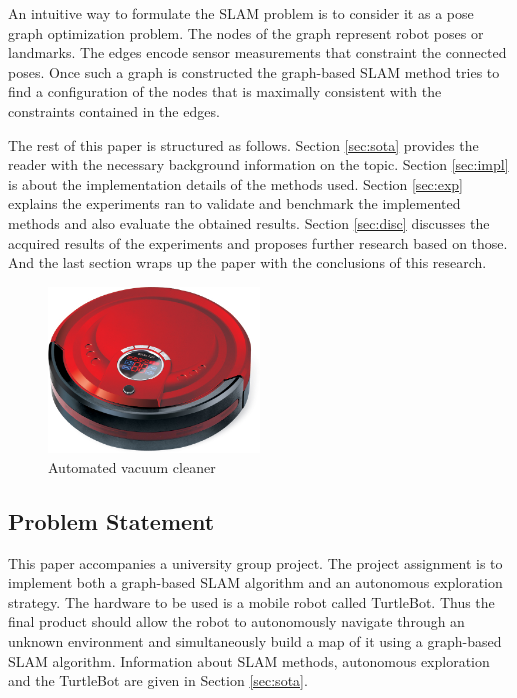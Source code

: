 \documentclass{ba-kecs}
\begin{document}
An intuitive way to formulate the SLAM problem is to consider it as a pose graph optimization problem. The nodes of the graph represent robot poses or landmarks. The edges encode sensor measurements that constraint the connected poses. Once such a graph is constructed the graph-based SLAM method tries to find a configuration of the nodes that is maximally consistent with the constraints contained in the edges.

The rest of this paper is structured as follows. Section \ref{sec:sota} provides the reader with the necessary background information on the topic. Section \ref{sec:impl} is about the implementation details of the methods used. Section \ref{sec:exp} explains the experiments ran to validate and benchmark the implemented methods and also evaluate the obtained results. Section \ref{sec:disc} discusses the acquired results of the experiments and proposes further research based on those. And the last section wraps up the paper with the conclusions of this research.

\begin{figure}[htp]
	\centering
		\includegraphics[width=0.50\textwidth]{figures/vacuum_cleaner.jpg}
	\caption{Automated vacuum cleaner}
	\label{fig:vacuum_cleaner}
\end{figure}

\subsection{Problem Statement}
\label{sec:problem}
This paper accompanies a university group project. The project assignment is to implement both a graph-based SLAM algorithm and an autonomous exploration strategy. The hardware to be used is a mobile robot called TurtleBot. Thus the final product should allow the robot to autonomously navigate through an unknown environment and simultaneously build a map of it using a graph-based SLAM algorithm. Information about SLAM methods, autonomous exploration and the TurtleBot are given in Section \ref{sec:sota}.  
\end{document}
